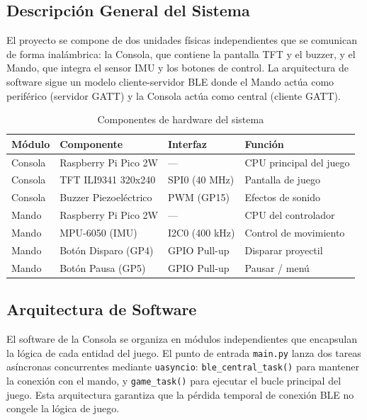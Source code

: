 
\subsection{Descripción General del Sistema}

El proyecto se compone de dos unidades físicas 
independientes que se comunican de forma inalámbrica: 
la Consola, que contiene la pantalla TFT y el buzzer, 
y el Mando, que integra el sensor IMU y los botones de control.
La arquitectura de software sigue un modelo cliente-servidor 
BLE donde el Mando actúa como periférico (servidor GATT) y 
la Consola actúa como central (cliente GATT).

\begin{table}[H]
    \centering
    \caption{Componentes de hardware del sistema}
    \label{tab:hardware}
    \begin{tabular}{|l|l|l|l|}
        \hline
        \textbf{Módulo} & \textbf{Componente} & \textbf{Interfaz} & \textbf{Función} \\ \hline
        Consola & Raspberry Pi Pico 2W & --- & CPU principal del juego \\ \hline
        Consola & TFT ILI9341 320x240 & SPI0 (40 MHz) & Pantalla de juego \\ \hline
        Consola & Buzzer Piezoeléctrico & PWM (GP15) & Efectos de sonido \\ \hline
        Mando & Raspberry Pi Pico 2W & --- & CPU del controlador \\ \hline
        Mando & MPU-6050 (IMU) & I2C0 (400 kHz) & Control de movimiento \\ \hline
        Mando & Botón Disparo (GP4) & GPIO Pull-up & Disparar proyectil \\ \hline
        Mando & Botón Pausa (GP5) & GPIO Pull-up & Pausar / menú \\ \hline
    \end{tabular}
\end{table}


\subsection{Arquitectura de Software}

El software de la Consola se organiza en módulos independientes que encapsulan la lógica de cada entidad del juego. El punto de entrada \texttt{main.py} lanza dos tareas asíncronas concurrentes mediante \texttt{uasyncio}: \texttt{ble\_central\_task()} para mantener la conexión con el mando, y \texttt{game\_task()} para ejecutar el bucle principal del juego. Esta arquitectura garantiza que la pérdida temporal de conexión BLE no congele la lógica de juego.

